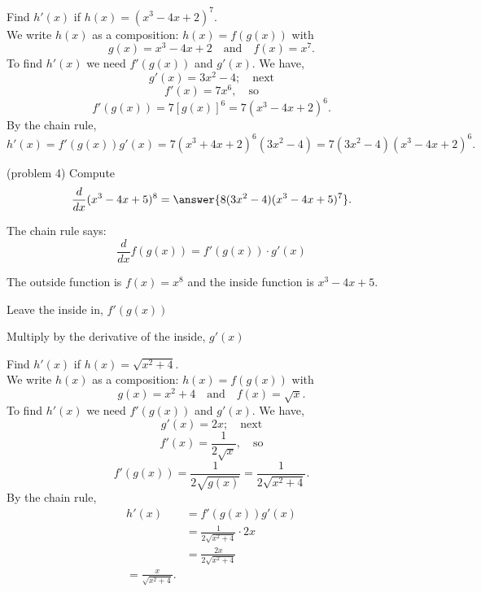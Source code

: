 \documentclass[handout]{ximera}
\begin{document}
\begin{example}[example 4]

Find $h'(x)$ if $h(x) = (x^3 - 4x + 2)^7$.\\
We write $h(x)$ as a composition: $h(x)=f(g(x))$ with 
\[
g(x) = x^3 - 4x + 2  \quad \text{and} \quad  f(x) = x^7.
\]
To find $h'(x)$ we need $f'(g(x))$ and $g'(x)$.  We have,
\[
g'(x) =3x^2 - 4; \quad \text{next} 
\]
\[
f'(x) = 7x^6 , \quad \text{so}
\]
\[
f'(g(x)) = 7[g(x)]^6 = 7(x^3 - 4x + 2)^6 .
\]
By the chain rule,
\[
h'(x) = f'(g(x))g'(x) = 7(x^3 + 4x + 2)^6(3x^2 - 4)=7(3x^2 - 4)(x^3 - 4x + 2)^6.
\]
\end{example}

\begin{center}
\begin{foldable}
\end{foldable}
\end{center}




\begin{problem}(problem 4)
  Compute
  \[
  \frac{d}{dx} (x^3 - 4x + 5)^8 = \answer{8(3x^2 - 4)(x^3 - 4x + 5)^7 }.
  \]
  
    \begin{hint}
      The chain rule says:
      \[
      \frac{d}{dx} f(g(x)) = f'(g(x))\cdot g'(x)
      \]
    \end{hint}
    \begin{hint}
      The outside function is $f(x) = x^8$ and the inside
      function is $x^3 - 4x + 5$.
    \end{hint}
    \begin{hint}
		  Leave the inside in, $f'(g(x))$
		\end{hint}
		\begin{hint}
		  Multiply by the derivative of the inside, $g'(x)$
		\end{hint}
    
\end{problem}




\begin{example}[example 5]

Find $h'(x)$ if $h(x) = \sqrt{x^2 + 4}$.\\
We write $h(x)$ as a composition: $h(x)=f(g(x))$ with 
\[
g(x) = x^2 + 4  \quad \text{and} \quad  f(x) = \sqrt x.
\] 
To find $h'(x)$ we need $f'(g(x))$ and $g'(x)$.  We have,
\[
g'(x) = 2x; \quad \text{next} 
\]
\[
f'(x) = \frac{1}{2\sqrt x} , \quad \text{so}
\] 
\[
f'(g(x)) = \frac{1}{2\sqrt {g(x)}}=\frac{1}{2\sqrt {x^2 + 4}}.
\]
By the chain rule,
\begin{align*}
h'(x) &= f'(g(x))g'(x)\\
&= \frac{1}{2\sqrt {x^2 + 4}}\cdot 2x\\
&= \frac{2x}{2\sqrt {x^2 + 4}}\\
=\frac{x}{\sqrt {x^2 + 4}}.
\end{align*}
\end{example}
\end{document}
